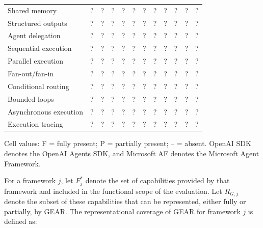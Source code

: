 \begin{table}[t]
\begin{tabularx}{\textwidth}{
        @{}
        >{\raggedright\arraybackslash}X
        ccccccccccc
        @{}
    }
        Shared memory
        & ? & ? & ? & ? & ? & ? & ? & ? & ? & ? & ? \\

        Structured outputs
        & ? & ? & ? & ? & ? & ? & ? & ? & ? & ? & ? \\

        Agent delegation
        & ? & ? & ? & ? & ? & ? & ? & ? & ? & ? & ? \\

        Sequential execution
        & ? & ? & ? & ? & ? & ? & ? & ? & ? & ? & ? \\

        Parallel execution
        & ? & ? & ? & ? & ? & ? & ? & ? & ? & ? & ? \\

        Fan-out/fan-in
        & ? & ? & ? & ? & ? & ? & ? & ? & ? & ? & ? \\

        Conditional routing
        & ? & ? & ? & ? & ? & ? & ? & ? & ? & ? & ? \\

        Bounded loops
        & ? & ? & ? & ? & ? & ? & ? & ? & ? & ? & ? \\

        Asynchronous execution
        & ? & ? & ? & ? & ? & ? & ? & ? & ? & ? & ? \\

        Execution tracing
        & ? & ? & ? & ? & ? & ? & ? & ? & ? & ? & ? \\

        \bottomrule
    \end{tabularx}

    \vspace{0.3em}
        \begin{minipage}{0.98\textwidth}
            \scriptsize
            Cell values: F = fully present; P = partially present;
            -- = absent. OpenAI SDK denotes the OpenAI Agents SDK,
            and Microsoft AF denotes the Microsoft Agent Framework.
        \end{minipage}
\end{table}

For a framework \(j\), let \(F^{*}_{j}\) denote the set of capabilities
provided by that framework and included in the functional scope of the
evaluation. Let \(R_{G,j}\) denote the subset of these capabilities that can
be represented, either fully or partially, by GEAR. The representational
coverage of GEAR for framework \(j\) is defined as:


